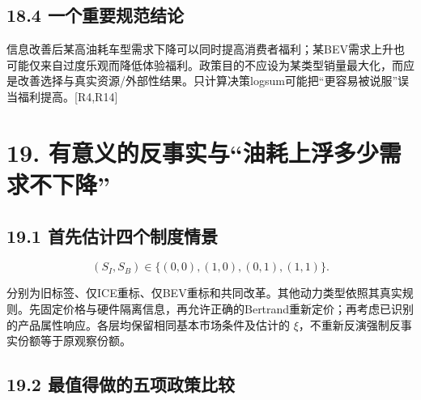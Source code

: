 \documentclass[
  11pt,
]{article}
\begin{document}
\subsection{18.4
一个重要规范结论}\label{ux4e00ux4e2aux91cdux8981ux89c4ux8303ux7ed3ux8bba}

信息改善后某高油耗车型需求下降可以同时提高消费者福利；某BEV需求上升也可能仅来自过度乐观而降低体验福利。政策目的不应设为某类型销量最大化，而应是改善选择与真实资源/外部性结果。只计算决策logsum可能把``更容易被说服''误当福利提高。{[}R4,R14{]}

\section{19.
有意义的反事实与``油耗上浮多少需求不下降''}\label{ux6709ux610fux4e49ux7684ux53cdux4e8bux5b9eux4e0eux6cb9ux8017ux4e0aux6d6eux591aux5c11ux9700ux6c42ux4e0dux4e0bux964d}

\subsection{19.1
首先估计四个制度情景}\label{ux9996ux5148ux4f30ux8ba1ux56dbux4e2aux5236ux5ea6ux60c5ux666f}

\[
(S_I,S_B)\in\{(0,0),(1,0),(0,1),(1,1)\}.
\tag{83}
\]

分别为旧标签、仅ICE重标、仅BEV重标和共同改革。其他动力类型依照其真实规则。先固定价格与硬件隔离信息，再允许正确的Bertrand重新定价；再考虑已识别的产品属性响应。各层均保留相同基本市场条件及估计的
\(\xi\)，不重新反演强制反事实份额等于原观察份额。

\subsection{19.2
最值得做的五项政策比较}\label{ux6700ux503cux5f97ux505aux7684ux4e94ux9879ux653fux7b56ux6bd4ux8f83}
\end{document}
